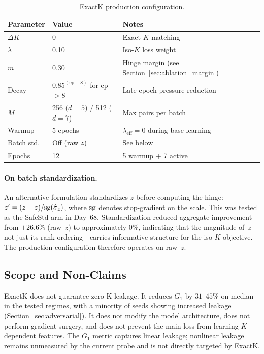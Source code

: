 \begin{table}[htbp]
\caption{ExactK production configuration.}
\label{tab:hyperparams}
\begin{ruledtabular}
\begin{tabular}{lll}
Parameter & Value & Notes \\
\hline
$\Delta K$ & 0 & Exact $K$ matching \\
$\lambda$ & 0.10 & Iso-$K$ loss weight \\
$m$ & 0.30 & Hinge margin (see Section~\ref{sec:ablation_margin}) \\
Decay & $0.85^{(\text{ep}-8)}$ for ep $> 8$ & Late-epoch pressure reduction \\
$M$ & 256 ($d{=}5$) / 512 ($d{=}7$) & Max pairs per batch \\
Warmup & 5 epochs & $\lambda_{\text{eff}}{=}0$ during base learning \\
Batch std. & Off (raw $z$) & See below \\
Epochs & 12 & 5 warmup + 7 active \\
\end{tabular}
\end{ruledtabular}
\end{table}

\paragraph{On batch standardization.} An alternative formulation standardizes $z$ before computing the hinge: $z' = (z - \bar{z}) / \mathrm{sg}(\hat{\sigma}_z)$, where $\mathrm{sg}$ denotes stop-gradient on the scale. This was tested as the SafeStd arm in Day~68. Standardization reduced aggregate improvement from $+26.6\%$ (raw~$z$) to approximately $0\%$, indicating that the magnitude of~$z$---not just its rank ordering---carries informative structure for the iso-$K$ objective. The production configuration therefore operates on raw~$z$.

\subsection{Scope and Non-Claims}

ExactK does not guarantee zero K-leakage. It reduces $G_1$ by $31$--$45\%$ on median in the tested regimes, with a minority of seeds showing increased leakage (Section~\ref{sec:adversarial}). It does not modify the model architecture, does not perform gradient surgery, and does not prevent the main loss from learning $K$-dependent features. The $G_1$ metric captures linear leakage; nonlinear leakage remains unmeasured by the current probe and is not directly targeted by ExactK.
